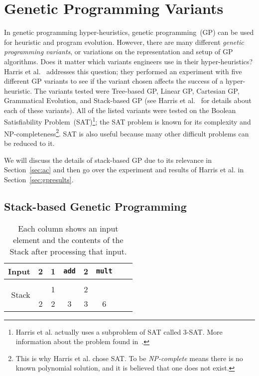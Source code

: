\documentclass{sig-alternate}
\begin{document}
\section{Genetic Programming Variants}
\label{sec:gpvariants}
In genetic programming hyper-heuristics, genetic programming~(GP) can be used for heuristic and program evolution. However, there are many different \textit{genetic programming variants}, or variations on the representation and setup of GP algorithms. Does it matter which variants engineers use in their hyper-heuristics? Harris et al.~\cite{harris:2015} addresses this question; they performed an experiment with five different GP variants to see if the variant chosen affects the success of a hyper-heuristic. The variants tested were Tree-based GP, Linear GP, Cartesian GP, Grammatical Evolution, and Stack-based GP (see Harris et al.~\cite{harris:2015} for details about each of these variants). All of the listed variants were tested on the Boolean Satisfiability Problem~(SAT)\footnote{Harris et al. actually uses a subproblem of SAT called 3-SAT. More information about the problem found in~\cite{harris:2015}.}; the SAT problem is known for its complexity and NP-compl\-eteness\footnote{This is why Harris et al. chose SAT. To be \textit{NP-complete} means there is no known polynomial solution, and it is believed that one does not exist.}. SAT is also useful because many other difficult problems can be reduced to it. 

We will discuss the details of stack-based GP due to its relevance in Section~\ref{sec:ac} and then go over the experiment and results of Harris et al. in Section~\ref{sec:gpresults}.

\subsection{Stack-based Genetic Programming}
\label{sec:sgp}
\begin{table}
	\centering
	\begin{tabular}{|r|c|c|c|c|c|c|c|}
		\hline
		Input & 2 & 1 & \texttt{add} & 2 & \texttt{mult} \\
		\hline
		\multirow{3}{*}{Stack} & & & & &\\
		&   & 1 &   & 2 &   \\
		& 2 & 2 & 3 & 3 & 6 \\
		\hline
	\end{tabular}
	\caption{Each column shows an input element and the contents of the Stack after processing that input.}
	\label{tab:stacks}
\end{table}
\end{document}
